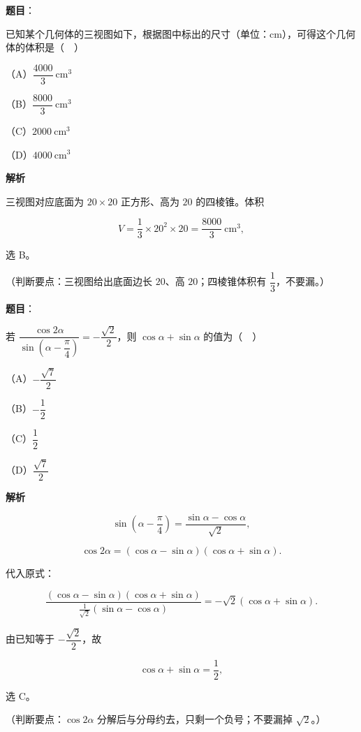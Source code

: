 \begin{answer}

\textbf{题目}：

已知某个几何体的三视图如下，根据图中标出的尺寸（单位：$\mathrm{cm}$），可得这个几何体的体积是（　）
\nopagebreak[4]
\begin{center}\end{center}
\nopagebreak[4]
（A）$\dfrac{4000}{3}\ \mathrm{cm^3}$

（B）$\dfrac{8000}{3}\ \mathrm{cm^3}$

（C）$2000\ \mathrm{cm^3}$

（D）$4000\ \mathrm{cm^3}$

\textbf{解析}

三视图对应底面为 $20\times20$ 正方形、高为 $20$ 的四棱锥。体积

\nopagebreak[4]
\[V=\frac13\times20^2\times20=\frac{8000}{3}\ \mathrm{cm^3},\]

选 B。

（判断要点：三视图给出底面边长 $20$、高 $20$；四棱锥体积有 $\dfrac13$，不要漏。）


\end{answer}
\begin{answer}

\textbf{题目}：

若 $\dfrac{\cos2\alpha}{\sin\left(\alpha-\dfrac{\pi}{4}\right)}=-\dfrac{\sqrt2}{2}$，则 $\cos\alpha+\sin\alpha$ 的值为（　）

（A）$-\dfrac{\sqrt7}{2}$

（B）$-\dfrac12$

（C）$\dfrac12$

（D）$\dfrac{\sqrt7}{2}$

\textbf{解析}

\nopagebreak[4]
\[\sin\left(\alpha-\frac{\pi}{4}\right)=\frac{\sin\alpha-\cos\alpha}{\sqrt2},\]

\nopagebreak[4]
\[\cos2\alpha=(\cos\alpha-\sin\alpha)(\cos\alpha+\sin\alpha).\]

代入原式：

\nopagebreak[4]
\[\frac{(\cos\alpha-\sin\alpha)(\cos\alpha+\sin\alpha)}{\frac1{\sqrt2}(\sin\alpha-\cos\alpha)}=-\sqrt2(\cos\alpha+\sin\alpha).\]

由已知等于 $-\dfrac{\sqrt2}{2}$，故

\nopagebreak[4]
\[\cos\alpha+\sin\alpha=\frac12,\]

选 C。

（判断要点：$\cos2\alpha$ 分解后与分母约去，只剩一个负号；不要漏掉 $\sqrt2$。）


\end{answer}
